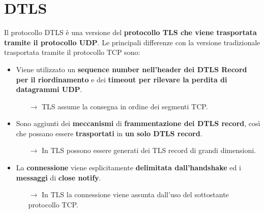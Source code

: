 \section{DTLS}
Il protocollo DTLS è una versione del \textbf{protocollo TLS che viene trasportata tramite il protocollo UDP}. Le principali differenze con la versione tradizionale trasportata tramite il protocollo TCP sono:
\begin{definition}\label{def:dtls}
\begin{itemize}
    \item Viene utilizzato un \textbf{sequence number nell’header dei DTLS Record per il riordinamento} e dei \textbf{timeout per rilevare la perdita di datagrammi UDP}. 
    \begin{itemize}
        \item [$\rightarrow$]TLS assume la consegna in ordine dei segmenti TCP.
    \end{itemize}
    \item Sono aggiunti dei \textbf{meccanismi} di \textbf{frammentazione dei DTLS record}, così che possano essere \textbf{trasportati} in \textbf{un solo DTLS record}.
    \begin{itemize}
        \item [$\rightarrow$] In TLS possono essere generati dei TLS record di grandi dimensioni.
    \end{itemize}
    \item La \textbf{connessione} viene esplicitamente \textbf{delimitata dall’handshake} ed i \textbf{messaggi} di \textbf{close notify}.
     \begin{itemize}
        \item [$\rightarrow$] In TLS la connessione viene assunta dall’uso del sottostante protocollo TCP.
    \end{itemize}
\end{itemize}
\end{definition}
